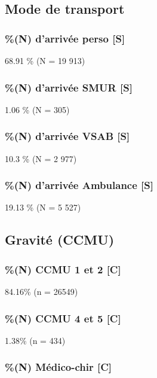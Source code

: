 \documentclass[]{article}
\begin{document}
\subsection{Mode de transport}\label{mode-de-transport}

\subsubsection{\%(N) d'arrivée perso {[}S{]}}\label{n-darrivee-perso-s}

68.91 \% (N = 19 913)

\subsubsection{\%(N) d'arrivée SMUR {[}S{]}}\label{n-darrivee-smur-s}

1.06 \% (N = 305)

\subsubsection{\%(N) d'arrivée VSAB {[}S{]}}\label{n-darrivee-vsab-s}

10.3 \% (N = 2 977)

\subsubsection{\%(N) d'arrivée Ambulance
{[}S{]}}\label{n-darrivee-ambulance-s}

19.13 \% (N = 5 527)

\subsection{Gravité (CCMU)}\label{gravite-ccmu}

\subsubsection{\%(N) CCMU 1 et 2 {[}C{]}}\label{n-ccmu-1-et-2-c}

84.16\% (n = 26549)

\subsubsection{\%(N) CCMU 4 et 5 {[}C{]}}\label{n-ccmu-4-et-5-c}

1.38\% (n = 434)

\subsubsection{\%(N) Médico-chir {[}C{]}}\label{n-medico-chir-c}
\end{document}
